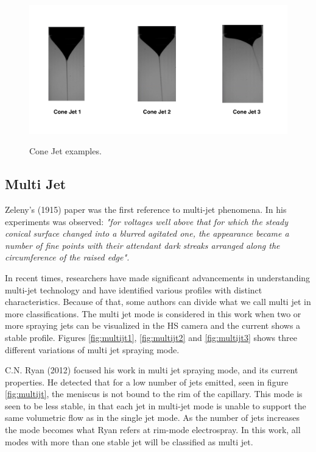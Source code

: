   \begin{figure}[H]
      \center
      \includegraphics[width=15cm]{Figuras/april/conjet.png}
      \label{fig:conjt}
      \caption{Cone Jet examples.}
  \end{figure}


\subsection{Multi Jet}
\label{subsec:Multi Jet}

Zeleny's (1915)\cite{zeleny} paper was the first reference to multi-jet phenomena. In his experiments was observed:
\emph{"for voltages well above that for which the steady conical surface changed into a blurred agitated one, the appearance became a number of fine points with their attendant dark streaks arranged along the circumference of the raised edge".}

In recent times, researchers have made significant advancements in understanding multi-jet technology and have identified various profiles with distinct characteristics. Because of that, some authors can divide what we call multi jet in more classifications.
The multi jet mode is considered in this work when two or more spraying jets can be visualized in the HS camera and the current shows a stable profile. Figures \ref{fig:multijt1}, \ref{fig:multijt2} and \ref{fig:multijt3} shows three different variations of multi jet spraying mode.

C.N. Ryan (2012)\cite{Ryan} focused his work in multi jet spraying mode, and its current properties. 
He detected that for a low number of jets emitted, seen in figure \ref{fig:multijt}, the meniscus is not bound to the rim of the capillary. 
This mode is seen to be less stable, in that each jet in multi-jet mode is unable to support the same volumetric flow as in the single jet mode.
As the number of jets increases the mode becomes what Ryan refers at rim-mode electrospray. 
In this work, all modes with more than one stable jet will be classified as multi jet.


